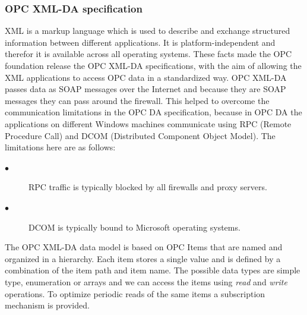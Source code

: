 \documentclass[twosided,a4,10pt]{article}
\begin{document}
\begin{multicols}{2}
  \subsubsection{OPC XML-DA specification}	
   	XML is a markup language which is used to describe and exchange structured information between different applications. It is platform-independent and therefor it is available across all operating systems. These facts made the OPC foundation release the OPC XML-DA specifications, with the aim of allowing the XML applications to access OPC data in a standardized way. OPC XML-DA passes data as SOAP messages over the Internet and because they are SOAP messages they can pass around the firewall. This helped to overcome the communication limitations in the OPC DA specification, because in OPC DA the applications on different Windows machines communicate using RPC (Remote Procedure Call) and DCOM (Distributed Component Object Model). The limitations here are as follows:
   	\begin{description}
   	\item[$\bullet$]
   	RPC traffic is typically blocked by all firewalls and proxy servers.
   	\item[$\bullet$]
   	DCOM is typically bound to Microsoft operating systems.
   \end{description}
	
   The OPC XML-DA data model is based on OPC Items that are named and organized in a hierarchy. Each item stores a single value and is defined by a combination of the item path and item name. The possible data types are simple type, enumeration or arrays and we can access the items using \textit{read} and \textit{write} operations. To optimize periodic reads of the same items a subscription mechanism is provided.

\end{multicols}
\end{document}

